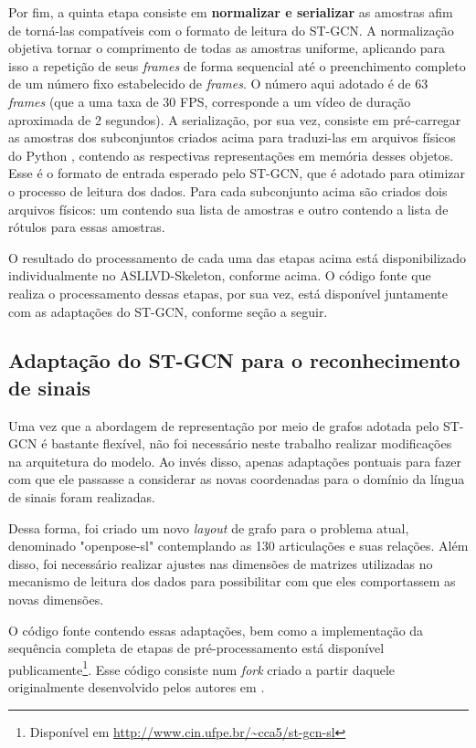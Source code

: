 Por fim, a quinta etapa consiste em \textbf{normalizar e serializar} as amostras afim de torná-las compatíveis com o formato de leitura do ST-GCN. A normalização objetiva tornar o comprimento de todas as amostras uniforme, aplicando para isso a repetição de seus \textit{frames} de forma sequencial até o preenchimento completo de um número fixo estabelecido de \textit{frames}. O número aqui adotado é de 63 \textit{frames} (que a uma taxa de 30 FPS, corresponde a um vídeo de duração aproximada de 2 segundos). A serialização, por sua vez, consiste em pré-carregar as amostras dos subconjuntos criados acima para traduzi-las em arquivos físicos do Python \cite{python}, contendo as respectivas representações em memória desses objetos. Esse é o formato de entrada esperado pelo ST-GCN, que é adotado para otimizar o processo de leitura dos dados. Para cada subconjunto acima são criados dois arquivos físicos: um contendo sua lista de amostras e outro contendo a lista de rótulos para essas amostras. 

O resultado do processamento de cada uma das etapas acima está disponibilizado individualmente no ASLLVD-Skeleton, conforme acima. O código fonte que realiza o processamento dessas etapas, por sua vez, está disponível juntamente com as adaptações do ST-GCN, conforme seção a seguir.


\subsection{Adaptação do ST-GCN para o reconhecimento de sinais} %
\label{sec:adaptacao-st-gcn}

Uma vez que a abordagem de representação por meio de grafos adotada pelo ST-GCN é bastante flexível, não foi necessário neste trabalho realizar modificações na arquitetura do modelo. Ao invés disso, apenas adaptações pontuais para fazer com que ele passasse a considerar as novas coordenadas para o domínio da língua de sinais foram realizadas. 

Dessa forma, foi criado um novo \textit{layout} de grafo para o problema atual, denominado "openpose-sl" contemplando as 130 articulações e suas relações. Além disso, foi necessário realizar ajustes nas dimensões de matrizes utilizadas no mecanismo de leitura dos dados para possibilitar com que eles comportassem as novas dimensões.

O código fonte contendo essas adaptações, bem como a implementação da sequência completa de etapas de pré-processamento está disponível publicamente\footnote{
    Disponível em \url{http://www.cin.ufpe.br/~cca5/st-gcn-sl}
}. Esse código consiste num \textit{fork} criado a partir daquele originalmente desenvolvido pelos autores em \cite{st-gcn-2018}.



